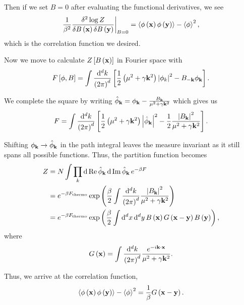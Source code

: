 Then if we set $B = 0$ after evaluating the functional derivatives, we see
\begin{align}
    \frac{1}{\beta^2} \frac{\delta^2 \log Z}{\delta B \left( \vb{x} \right) \delta B \left( \vb{y} \right) } \bigg|_{B=0} = \left<\phi \left( \vb{x} \right) \phi \left( \vb{y} \right)  \right> - \left<\phi \right>^2
,\end{align}
which is the correlation function we desired.


Now we move to calculate $Z \left[ B \left( \vb{x} \right)  \right] $ in Fourier space with
\begin{align}
    F \left[ \phi ,B  \right] = \int \frac{\dd{^{d}k}}{\left( 2\pi \right)^{d}} \left[ \frac{1}{2} \left( \mu^2 + \gamma \vb{k}^2 \right) \left| \phi_k \right|^2 - B_{-\vb{k}} \phi_{\vb{k}} \right] 
.\end{align}

We complete the square by writing $\hat{\phi}_{\vb{k}} = \phi_{\vb{k}} - \frac{B_{\vb{k}}}{\mu^2 + \gamma \vb{k}^2}$ which gives us
\begin{align}
    F = \int \frac{\dd{^{d}k}}{\left( 2\pi \right)^{d}} \left[ \frac{1}{2} \left( \mu^2 + \gamma \vb{k}^2 \right) \left| \hat{\phi}_{\vb{k}} \right|^2 - \frac{1}{2} \frac{\left| B_{\vb{k}} \right|^2}{\mu^2 + \gamma \vb{k}^2} \right] 
.\end{align}

Shifting $\phi_{\vb{k}} \to \hat{\phi}_{\vb{k}}$ in the path integral leaves the measure invariant as it still spans all possible functions. Thus, the partition function becomes
\begin{align}
    Z &= N \int \prod_{k} \dd{\Re \hat{\phi}_{\vb{k}}} \dd{\Im \hat{\phi}_{\vb{k}}} e^{- \beta F} \\
    &= e^{-\beta F_{\text{thermo}}} \exp \left( \frac{\beta}{2} \int \frac{\dd{^{d}k}}{\left( 2\pi \right)^{d}} \frac{\left| B_{\vb{k}} \right|^2}{\mu^2 + \gamma \vb{k}^2} \right)  \\
    &= e^{-\beta F_\text{thermo}} \exp \left( \frac{\beta}{2} \int \dd{^{d}x} \dd{^{d}y} B\left( \vb{x}\right) G \left( \vb{x} - \vb{y}\right) B \left( \vb{y}     \right)  \right) 
,\end{align}
where 
\begin{align}
    G \left( \vb{x} \right) = \int \frac{\dd{^{d}k}}{\left( 2\pi \right)^{d}} \frac{e^{-i \vb{k} \cdot \vb{x}}}{\mu^2 + \gamma \vb{k}^2}
.\end{align}

Thus, we arrive at the correlation function,
\begin{align}
    \left< \phi \left( \vb{x} \right) \phi \left( \vb{y} \right)  \right> - \left<\phi \right>^2 = \frac{1}{\beta} G \left( \vb{x} - \vb{y} \right) 
.\end{align}

